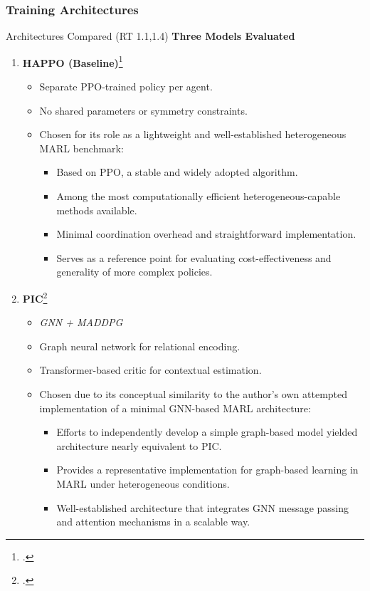\subsubsection{Training Architectures}

\begin{frame}{Architectures Compared (RT 1.1,1.4)}
    \textbf{Three Models Evaluated}
    \begin{enumerate}
        \item \textbf{HAPPO (Baseline)}\footcite{zhong2024}
          \begin{itemize}
            \item Separate PPO-trained policy per agent.
            \item No shared parameters or symmetry constraints.
            \item Chosen for its role as a lightweight and well-established heterogeneous MARL benchmark:
            \begin{itemize}
                \item Based on PPO, a stable and widely adopted algorithm.
                \item Among the most computationally efficient heterogeneous-capable methods available.
                \item Minimal coordination overhead and straightforward implementation.
                \item Serves as a reference point for evaluating cost-effectiveness and generality of more complex policies.
            \end{itemize}
          \end{itemize}
        \item \textbf{PIC}\footcite{liu2020b}
          \begin{itemize}
            \item \emph{GNN + MADDPG}
            \item Graph neural network for relational encoding.
            \item Transformer-based critic for contextual estimation.
            \item Chosen due to its conceptual similarity to the author's own attempted 
                implementation of a minimal GNN-based MARL architecture:
            \begin{itemize}
                \item Efforts to independently develop a simple graph-based model yielded architecture nearly equivalent to PIC.
                \item Provides a representative implementation for graph-based learning in MARL under heterogeneous conditions.
                \item Well-established architecture that integrates GNN message passing and attention mechanisms in a scalable way.
            \end{itemize}
          \end{itemize}
    \end{enumerate}
\end{frame}


